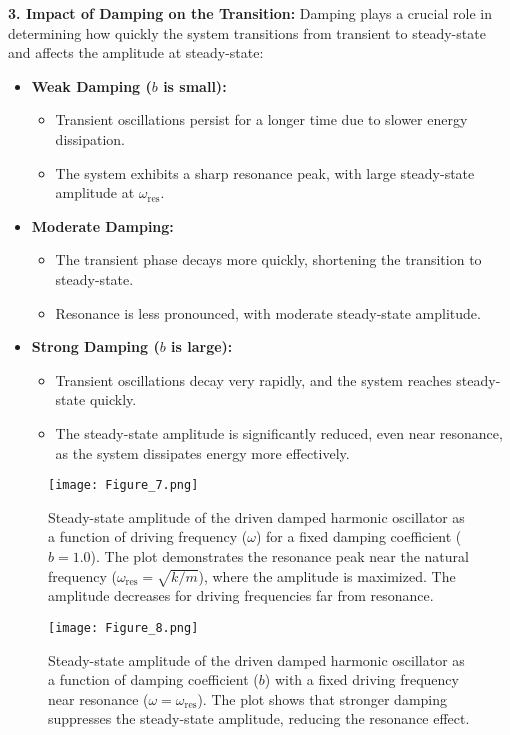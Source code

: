 \documentclass {article}
\begin{document}
\begin{enumerate}
\textbf{3. Impact of Damping on the Transition:}
Damping plays a crucial role in determining how quickly the system transitions from transient to steady-state and affects the amplitude at steady-state:
\begin{itemize}
    \item \textbf{Weak Damping ($b$ is small):}
    \begin{itemize}
        \item Transient oscillations persist for a longer time due to slower energy dissipation.
        \item The system exhibits a sharp resonance peak, with large steady-state amplitude at $\omega_{\text{res}}$.
    \end{itemize}
    \item \textbf{Moderate Damping:}
    \begin{itemize}
        \item The transient phase decays more quickly, shortening the transition to steady-state.
        \item Resonance is less pronounced, with moderate steady-state amplitude.
    \end{itemize}
    \item \textbf{Strong Damping ($b$ is large):}
    \begin{itemize}
        \item Transient oscillations decay very rapidly, and the system reaches steady-state quickly.
        \item The steady-state amplitude is significantly reduced, even near resonance, as the system dissipates energy more effectively.
    \end{itemize}
\end{itemize}

\begin{figure}[H]
    \centering
    \texttt{[image: Figure\_7.png]} %
    \caption{Steady-state amplitude of the driven damped harmonic oscillator as a function of driving frequency (\(\omega\)) for a fixed damping coefficient (\(b=1.0\)). The plot demonstrates the resonance peak near the natural frequency (\(\omega_{\text{res}} = \sqrt{k/m}\)), where the amplitude is maximized. The amplitude decreases for driving frequencies far from resonance.}
    \label{fig:amplitude_vs_omega}
\end{figure}

\begin{figure}[H]
    \centering
    \texttt{[image: Figure\_8.png]} %
    \caption{Steady-state amplitude of the driven damped harmonic oscillator as a function of damping coefficient (\(b\)) with a fixed driving frequency near resonance (\(\omega = \omega_{\text{res}}\)). The plot shows that stronger damping suppresses the steady-state amplitude, reducing the resonance effect.}
    \label{fig:amplitude_vs_b}
\end{figure}
    
    \vspace{3cm}
\end{enumerate}
\end{document}
